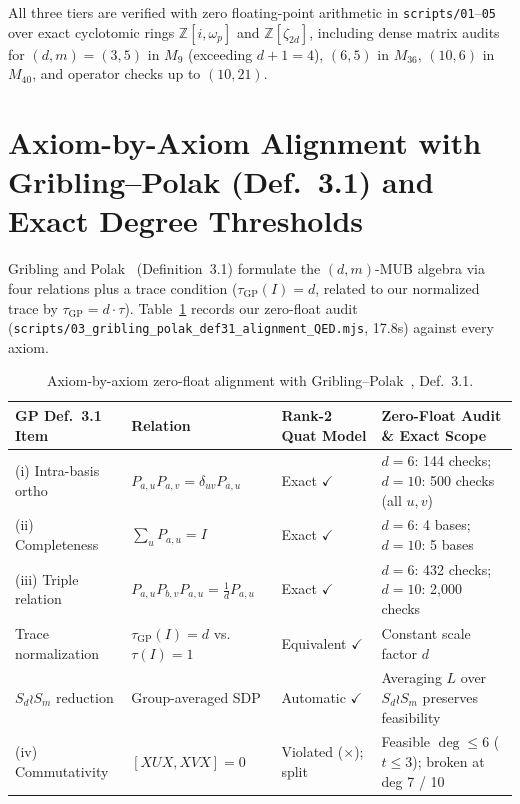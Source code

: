 \documentclass[11pt,a4paper]{article}
\theoremstyle{definition}
\newcommand{\Z}{\mathbb{Z}}
\begin{document}
All three tiers are verified with zero floating-point arithmetic in \texttt{scripts/01}--\texttt{05} over exact cyclotomic rings $\Z[i,\omega_p]$ and $\Z[\zeta_{2d}]$, including dense matrix audits for $(d,m)=(3,5)$ in $M_9$ (exceeding $d+1=4$), $(6,5)$ in $M_{36}$, $(10,6)$ in $M_{40}$, and operator checks up to $(10,21)$.

\section{Axiom-by-Axiom Alignment with Gribling--Polak (Def.\ 3.1) and Exact Degree Thresholds}
\label{sec:gp-align}

Gribling and Polak~\cite{GriblingPolak2024} (Definition~3.1) formulate the $(d,m)$-MUB algebra via four relations plus a trace condition ($\tau_{\mathrm{GP}}(I)=d$, related to our normalized trace by $\tau_{\mathrm{GP}} = d \cdot \tau$). Table~\ref{tab:gp} records our zero-float audit (\texttt{scripts/03\_gribling\_polak\_def31\_alignment\_QED.mjs}, 17.8s) against every axiom.

\begin{table}[h]
\centering
\footnotesize
\begin{tabular}{@{}lll>{\raggedright\arraybackslash}p{5.8cm}@{}}
\toprule
GP Def.\ 3.1 Item & Relation & Rank-2 Quat Model & Zero-Float Audit \& Exact Scope \\
\midrule
(i) Intra-basis ortho & $P_{a,u} P_{a,v} = \delta_{uv} P_{a,u}$ & Exact $\checkmark$ & $d=6$: 144 checks; $d=10$: 500 checks (all $u,v$) \\
(ii) Completeness & $\sum_u P_{a,u} = I$ & Exact $\checkmark$ & $d=6$: 4 bases; $d=10$: 5 bases \\
(iii) Triple relation & $P_{a,u} P_{b,v} P_{a,u} = \frac{1}{d} P_{a,u}$ & Exact $\checkmark$ & $d=6$: 432 checks; $d=10$: 2,000 checks \\
Trace normalization & $\tau_{\mathrm{GP}}(I)=d$ vs.\ $\tau(I)=1$ & Equivalent $\checkmark$ & Constant scale factor $d$ \\
$S_d \wr S_m$ reduction & Group-averaged SDP & Automatic $\checkmark$ & Averaging $L$ over $S_d \wr S_m$ preserves feasibility \\
(iv) Commutativity & $[XUX, XVX] = 0$ & Violated ($\times$); split & Feasible $\deg \le 6$ ($t \le 3$); broken at deg 7 / 10 \\
\bottomrule
\end{tabular}
\caption{Axiom-by-axiom zero-float alignment with Gribling--Polak~\cite{GriblingPolak2024}, Def.\ 3.1.}
\label{tab:gp}
\end{table}
\end{document}
